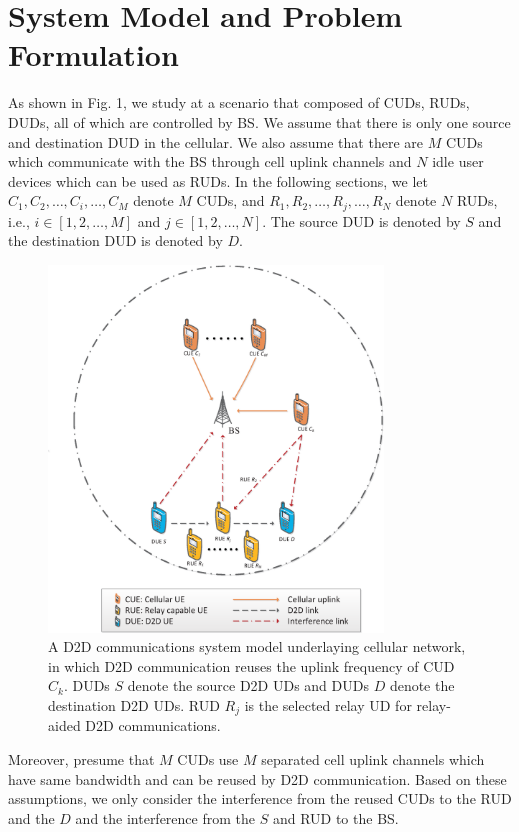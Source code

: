 \documentclass[conference]{IEEEtran}
\begin{document}
\section{System Model and Problem Formulation}
As shown in Fig. 1, we study at a scenario that composed of CUDs, RUDs, DUDs, all of which are controlled by BS. We assume that there is only one source and destination DUD in the cellular. We also assume that there are $M$ CUDs which communicate with the BS through cell uplink channels and $N$ idle user devices which can be used as RUDs. In the following sections, we let $C_{1},C_{2},\ldots,C_{i},\ldots,C_{M}$ denote $M$ CUDs, and $R_{1},R_{2},\ldots,R_{j},\ldots,R_{N}$ denote $N$ RUDs, i.e., $i\in\left[1,2,\ldots,M\right]$ and $j\in\left[1,2,\ldots,N\right]$. The source DUD is denoted by $S$ and the destination DUD is denoted by $D$.
\begin{figure}[!t]
\center
\includegraphics[width=3.5in]{fig1}
\caption{A D2D communications system model underlaying cellular network, in which D2D communication reuses the uplink frequency of CUD $C_k$. DUDs $S$ denote the source D2D UDs and DUDs $D$ denote the destination D2D UDs. RUD $R_j$ is the selected relay UD for relay-aided D2D communications.}
\label{fig_success}
\end{figure}

Moreover, presume that $M$ CUDs use $M$ separated cell uplink channels which have same bandwidth and can be reused by D2D communication. Based on these assumptions, we only consider the interference from the reused CUDs to the RUD and the $D$ and the interference from the $S$ and RUD to the BS.
\end{document}
